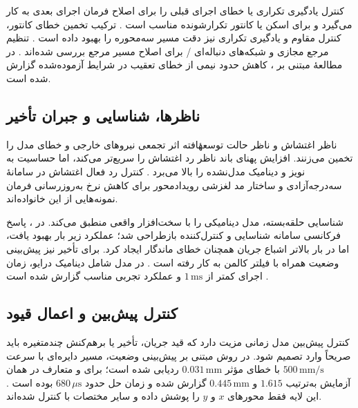 کنترل یادگیری تکراری یا  خطای اجرای قبلی را برای اصلاح فرمان اجرای بعدی به کار می‌گیرد و برای اسکن یا کانتور تکرارشونده مناسب است \cite{curtisstewartImplementationModularMagnetic2023}. ترکیب تخمین خطای کانتور، کنترل مقاوم و یادگیری تکراری نیز دقت مسیر سه‌محوره را بهبود داده است \cite{j.liHighPrecisionTriaxialContouring2026}. تنظیم مرجع مجازی و شبکه‌های دنباله‌ای / برای اصلاح مسیر مرجع بررسی شده‌اند \cite{campiVirtualReferenceFeedback2002,ouIntelligentFeedforwardCompensation2020,wangLSTMNNbasedReferenceTrajectory2025}. در مطالعهٔ مبتنی بر ، کاهش حدود نیمی از خطای تعقیب در شرایط آزموده‌شده گزارش شده است.

\subsection{ناظرها، شناسایی و جبران تأخیر}
\label{subsec:observers-identification-delay}

ناظر اغتشاش و ناظر حالت توسعهٔافته اثر تجمعی نیروهای خارجی و خطای مدل را تخمین می‌زنند. افزایش پهنای باند ناظر رد اغتشاش را سریع‌تر می‌کند، اما حساسیت به نویز و دینامیک مدل‌نشده را بالا می‌برد \cite{liuHybridHarmonicRBFNNBased2025}. کنترل رد فعال اغتشاش در سامانهٔ سه‌درجه‌آزادی \cite{zhangThreedegreeoffreedomPositioningControl2017} و ساختار مد لغزشی رویدادمحور برای کاهش نرخ به‌روزرسانی فرمان \cite{duDoubleEventTriggeredGlobal2026} نمونه‌هایی از این خانواده‌اند.

شناسایی حلقه‌بسته، مدل دینامیکی را با سخت‌افزار واقعی منطبق می‌کند. در \cite{nakataDriveStabilizationMultidegreeoffreedom2025}، پاسخ فرکانسی سامانه شناسایی و کنترل‌کننده بازطراحی شد؛ عملکرد زیر بار بهبود یافت، اما در بار بالاتر اشباع جریان همچنان خطای ماندگار ایجاد کرد. برای تأخیر نیز پیش‌بینی وضعیت همراه با فیلتر کالمن به کار رفته است \cite{xuPredictorbasedModelPredictive2023}. در مدل شامل دینامیک درایو، زمان اجرای کمتر از \(1\,\mathrm{ms}\) و عملکرد تجربی مناسب گزارش شده است \cite{ranDriveaugmentedModelPredictive2025}.

\subsection{کنترل پیش‌بین و اعمال قیود}
\label{subsec:model-predictive-control}

کنترل پیش‌بین مدل زمانی مزیت دارد که قید جریان، تأخیر یا برهم‌کنش چندمتغیره باید صریحاً وارد تصمیم شود. در روش مبتنی بر پیش‌بینی وضعیت، مسیر دایره‌ای با سرعت \(500\,\mathrm{mm/s}\) با خطای مؤثر \(0.031\,\mathrm{mm}\) ردیابی شده است؛ برای  و  متعارف در همان آزمایش به‌ترتیب \(1.615\) و \(0.445\,\mathrm{mm}\) گزارش شده و زمان حل حدود \(680\,\mu\mathrm{s}\) بوده است \cite{xuPredictorbasedModelPredictive2023}. این لایه فقط محورهای $x$ و $y$ را پوشش داده و سایر مختصات با  کنترل شده‌اند.

